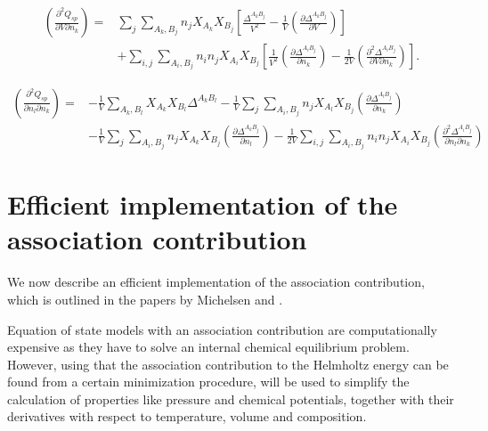 \documentclass[english]{../thermomemo/thermomemo}
\newcommand*{\pder}[2]{\left(\frac{\partial #1}{\partial #2}\right)}
\newcommand*{\pdcross}[3]{\left(\frac{\partial^2 #1}{\partial #2 \partial #3}\right)}
\begin{document}
\begin{align*}
  \pdcross{Q_{sp}}{V}{n_k} =& \sum_{j} \sum_{A_k,B_j} n_j X_{A_k} X_{B_j} \left[ \frac{\Delta^{A_k B_j}}{V^2} - \frac{1}{V} \pder{\Delta^{A_k B_j}}{V}\right] \\
  &+ \sum_{i,j} \sum_{A_i, B_j} n_i n_j X_{A_i} X_{B_j} \left[ \frac{1}{V^2} \pder{\Delta^{A_i B_j}}{n_k} - \frac{1}{2V} \pdcross{\Delta^{A_i B_j}}{V}{n_k} \right].
\end{align*}


\begin{align*}
  \pdcross{Q_{sp}}{n_l}{n_k} =& - \frac{1}{V} \sum_{A_k, B_l} X_{A_k} X_{B_l} \Delta^{A_k B_l} - \frac{1}{V} \sum_{j} \sum_{A_i, B_j} n_j X_{A_l} X_{B_j} \pder{\Delta^{A_l B_j}}{n_k} \\
  &- \frac{1}{V} \sum_{j} \sum_{A_i, B_j} n_j X_{A_k} X_{B_j} \pder{\Delta^{A_k B_j}}{n_l} - \frac{1}{2V} \sum_{i,j} \sum_{A_i, B_j} n_i n_j X_{A_i} X_{B_j} \pdcross{\Delta^{A_i B_j}}{n_l}{n_k}
\end{align*}


\section{Efficient implementation of the association contribution} \label{effImp}
We now describe an efficient implementation of the association contribution, which is outlined in the papers by Michelsen \cite{Michelsen01} and \cite{Michelsen06}.

Equation of state models with an association contribution are computationally expensive as they have to solve an internal chemical equilibrium problem. However, using that the association contribution to the Helmholtz energy can be found from a certain minimization procedure, will be used to simplify the calculation of properties like pressure and chemical potentials, together with their derivatives with respect to temperature, volume and composition.
\end{document}
